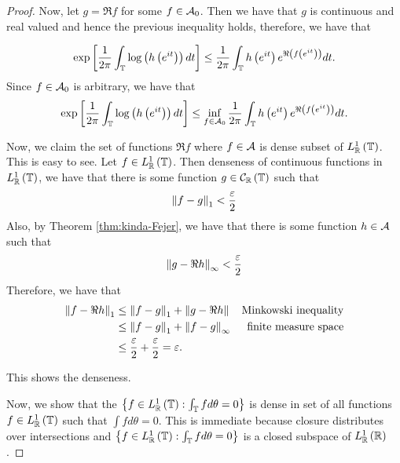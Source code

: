 \begin{proof}
    Now, let $g=\Re f$ for some $f\in {\cal A}_{0}$. Then we have that $g$ is continuous and real valued and hence the previous inequality holds, therefore, we have that 

    \begin{equation*}
	\exp\left[ \frac{1}{2\pi} \int_{\mathbb T} \log \left( h\left( e^{it} \right) \right) dt  \right] \le \frac{1}{2\pi} \int_{\mathbb T} h\left( e^{it} \right) e^{\Re \left( f\left( e^{it} \right) \right)} dt \text{.}
    \end{equation*}
    Since $f \in {\cal A}_{0}$ is arbitrary, we have that 
    \begin{equation*}
	\exp\left[ \frac{1}{2\pi} \int_{\mathbb T} \log \left( h\left( e^{it} \right) \right) dt  \right] \le \inf_{f\in{\cal A}_{0}} \frac{1}{2\pi} \int_{\mathbb T} h\left( e^{it} \right) e^{\Re \left( f\left( e^{it} \right) \right)} dt \text{.}
    \end{equation*}

    Now, we claim the set of functions $\Re f$ where $f\in {\cal A}$ is dense subset of $L^{1}_{\mathbb R}\left( \mathbb T \right)$. This is easy to see. Let $f\in L^{1}_{\mathbb R} \left( \mathbb T \right)$. Then denseness of continuous functions in $L^{1} _{\mathbb R}\left( \mathbb T \right)$, we have that there is some function $g\in {\cal C} _{\mathbb R} \left( \mathbb T \right)$ such that 
    \begin{align*}
	\left\lVert f-g \right\rVert_{1} < \frac{\varepsilon}{2}
    \end{align*}
    Also, by Theorem \ref{thm:kinda-Fejer}, we have that there is some function $h\in {\cal A}$ such that 
    \begin{align*}
	\left\lVert g-\Re h \right\rVert_{\infty} < \frac{\varepsilon}{2}
    \end{align*}
    Therefore, we have that
    \begin{align*}
	\left\lVert f-\Re h \right\rVert_{1} & \le \left\lVert f-g \right\rVert_{1} + \left\lVert g-\Re h \right\rVert & \text{Minkowski inequality} \\
	& \le \left\lVert f-g \right\rVert_{1} + \left\lVert f-g \right\rVert_{\infty} & \text{finite measure space} \\
	& \le \frac{\varepsilon}{2} + \frac{\varepsilon}{2} = \varepsilon\text{.}
    \end{align*}

    This shows the denseness.

    Now, we show that the $\left\{ f\in L^{1}_{\mathbb R} \left( \mathbb T \right) : \int_{\mathbb T} f d\theta = 0 \right\}$ is dense in set of all functions $f \in L^{1}_{\mathbb R} \left( \mathbb T \right)$ such that $\int f d\theta = 0$. This is immediate because closure distributes over intersections and $\left\{ f\in L^{1}_{\mathbb R} \left( \mathbb T \right) : \int_{\mathbb T} f d\theta = 0 \right\}$ is a closed subspace of $L^{1}_{\mathbb R} \left( \mathbb R \right)$.

\end{proof}

